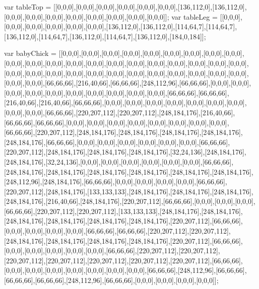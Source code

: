 var tableTop = [[0,0,0],[0,0,0],[0,0,0],[0,0,0],[0,0,0],[0,0,0],[136,112,0],[136,112,0],[0,0,0],[0,0,0],[0,0,0],[0,0,0],[0,0,0],[0,0,0],[0,0,0],[0,0,0]];
var tableLeg = [[0,0,0],[0,0,0],[0,0,0],[0,0,0],[0,0,0],[0,0,0],[136,112,0],[136,112,0],[114,64,7],[114,64,7],[136,112,0],[114,64,7],[136,112,0],[114,64,7],[136,112,0],[184,0,184]];

var babyChick = [[0,0,0],[0,0,0],[0,0,0],[0,0,0],[0,0,0],[0,0,0],[0,0,0],[0,0,0],[0,0,0],[0,0,0],[0,0,0],[0,0,0],[0,0,0],[0,0,0],[0,0,0],[0,0,0],[0,0,0],[0,0,0],[0,0,0],[0,0,0],[0,0,0],[0,0,0],[0,0,0],[0,0,0],[0,0,0],[0,0,0],[0,0,0],[0,0,0],[0,0,0],[0,0,0],[0,0,0],[0,0,0],[0,0,0],[0,0,0],[0,0,0],[66,66,66],[216,40,66],[66,66,66],[248,112,96],[66,66,66],[0,0,0],[0,0,0],[0,0,0],[0,0,0],[0,0,0],[0,0,0],[0,0,0],[0,0,0],[0,0,0],[0,0,0],[66,66,66],[66,66,66],[216,40,66],[216,40,66],[66,66,66],[0,0,0],[0,0,0],[0,0,0],[0,0,0],[0,0,0],[0,0,0],[0,0,0],[0,0,0],[0,0,0],[66,66,66],[220,207,112],[220,207,112],[248,184,176],[216,40,66],[66,66,66],[66,66,66],[0,0,0],[0,0,0],[0,0,0],[0,0,0],[0,0,0],[0,0,0],[0,0,0],[0,0,0],[66,66,66],[220,207,112],[248,184,176],[248,184,176],[248,184,176],[248,184,176],[248,184,176],[66,66,66],[0,0,0],[0,0,0],[0,0,0],[0,0,0],[0,0,0],[0,0,0],[66,66,66],[220,207,112],[248,184,176],[248,184,176],[248,184,176],[32,24,136],[248,184,176],[248,184,176],[32,24,136],[0,0,0],[0,0,0],[0,0,0],[0,0,0],[0,0,0],[0,0,0],[66,66,66],[248,184,176],[248,184,176],[248,184,176],[248,184,176],[248,184,176],[248,184,176],[248,112,96],[248,184,176],[66,66,66],[0,0,0],[0,0,0],[0,0,0],[0,0,0],[66,66,66],[220,207,112],[248,184,176],[133,133,133],[248,184,176],[248,184,176],[248,184,176],[248,184,176],[216,40,66],[248,184,176],[220,207,112],[66,66,66],[0,0,0],[0,0,0],[0,0,0],[66,66,66],[220,207,112],[220,207,112],[133,133,133],[248,184,176],[248,184,176],[248,184,176],[248,184,176],[248,184,176],[248,184,176],[220,207,112],[66,66,66],[0,0,0],[0,0,0],[0,0,0],[0,0,0],[66,66,66],[66,66,66],[220,207,112],[220,207,112],[248,184,176],[248,184,176],[248,184,176],[248,184,176],[220,207,112],[66,66,66],[0,0,0],[0,0,0],[0,0,0],[0,0,0],[0,0,0],[66,66,66],[220,207,112],[220,207,112],[220,207,112],[220,207,112],[220,207,112],[220,207,112],[220,207,112],[66,66,66],[0,0,0],[0,0,0],[0,0,0],[0,0,0],[0,0,0],[0,0,0],[0,0,0],[66,66,66],[248,112,96],[66,66,66],[66,66,66],[66,66,66],[248,112,96],[66,66,66],[0,0,0],[0,0,0],[0,0,0],[0,0,0]];

